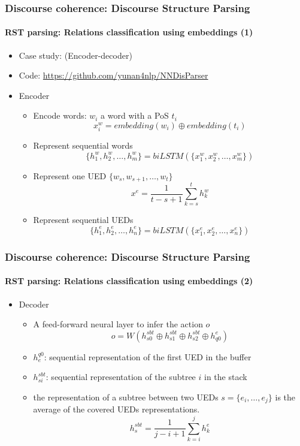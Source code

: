 \documentclass[xcolor=table]{beamer}
\begin{document}
\begin{frame}
	\frametitle{Discourse coherence: Discourse Structure Parsing}
	\framesubtitle{RST parsing: Relations classification using embeddings (1)}
	
	\begin{itemize}
		\item Case study: \cite{2018-yu-al} (Encoder-decoder)
		\item Code: \url{https://github.com/yunan4nlp/NNDisParser}
		\item Encoder 
		\begin{itemize}
			\item Encode words: $ w_i $ a word with a PoS $t_i$
			\[x_i^w = embedding(w_i) \oplus embedding(t_i)\]
			\item Represent sequential words
			\[ \{h_1^w, h_2^w, \ldots, h_m^w \} = biLSTM(\{x_1^w, x_2^w, \ldots, x_m^w \})\]
			\item Represent one UED $\{w_s, w_{s+1}, \ldots, w_t \}$
			\[ x^e = \frac{1}{t-s+1} \sum_{k=s}^{t} h_k^w\]
			\item Represent sequential UEDs
			\[ \{h_1^e, h_2^e, \ldots, h_n^e \} = biLSTM(\{x_1^e, x_2^e, \ldots, x_n^e \})\]
		\end{itemize}
	\end{itemize}
	
\end{frame}

\begin{frame}
	\frametitle{Discourse coherence: Discourse Structure Parsing}
	\framesubtitle{RST parsing: Relations classification using embeddings (2)}
	
	\begin{itemize}
		\item Decoder 
		\begin{itemize}
			\item A feed-forward neural layer to infer the action $o$
			\[o = W(h_{s0}^{sbt} \oplus h_{s1}^{sbt} \oplus h_{s2}^{sbt} \oplus h_{q0}^{e})\]
			\item $ h_{e}^{q0} $: sequential representation of the first UED in the buffer
			\item $h_{si}^{sbt}$: sequential representation of the subtree $i$ in the stack
			\item the representation of a subtree between two UEDs $ s= \{e_i, \ldots, e_j\}$ is the average of the covered UEDs representations. 
			\[ h_{s}^{sbt} = \frac{1}{j-i+1} \sum_{k=i}^{j} h_k^e\]
		\end{itemize}
	\end{itemize}
	
\end{frame}
\end{document}
